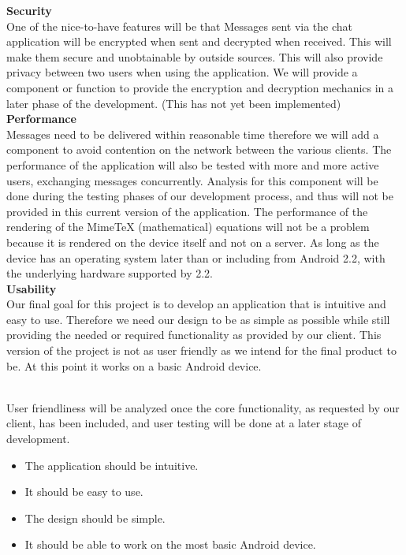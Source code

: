 \documentclass[29pt,a4paper]{moderncv}
\begin{document}
			\noindent\textbf{Security}\\
				One of the nice-to-have features will be that Messages sent via the chat application will be encrypted when sent and decrypted when received. This will make them secure and unobtainable by outside sources. This will also provide privacy between two users when using the application. We will provide a component or function to provide the encryption and decryption mechanics in a later phase of the development. (This has not yet been implemented)\\
			
			\noindent\textbf{Performance}\\
				Messages need to be delivered within reasonable time therefore we will add a component to avoid contention on the network between the various clients. The performance of the application will also be tested with more and more active users, exchanging messages concurrently. Analysis for this component will be done during the testing phases of our development process, and thus will not be provided in this current version of the application.
				The performance of the rendering of the MimeTeX (mathematical) equations will not be a problem because it is rendered on the device itself and not on a server. As long as the device has an operating system later than or including from Android 2.2, with the underlying hardware supported by 2.2.\\
				
			\noindent\textbf{Usability}
				\\Our final goal for this project is to develop an application that is intuitive and easy to use.  Therefore we need our design to be as simple as possible while still providing the needed or required functionality as provided by our client.  This version of the project is not as user friendly as we intend for the final product to be.  At this point it works on a basic Android device.  
				
				\\User friendliness will be analyzed once the core functionality, as requested by our client, has been included, and user testing will be done at a later stage of development.
				\begin{itemize}
					\item The application should be intuitive.
					\item It should be easy to use.
					\item The design should be simple.
					\item It should be able to work on the most basic Android device.\\
				\end{itemize}
				
\end{document}

